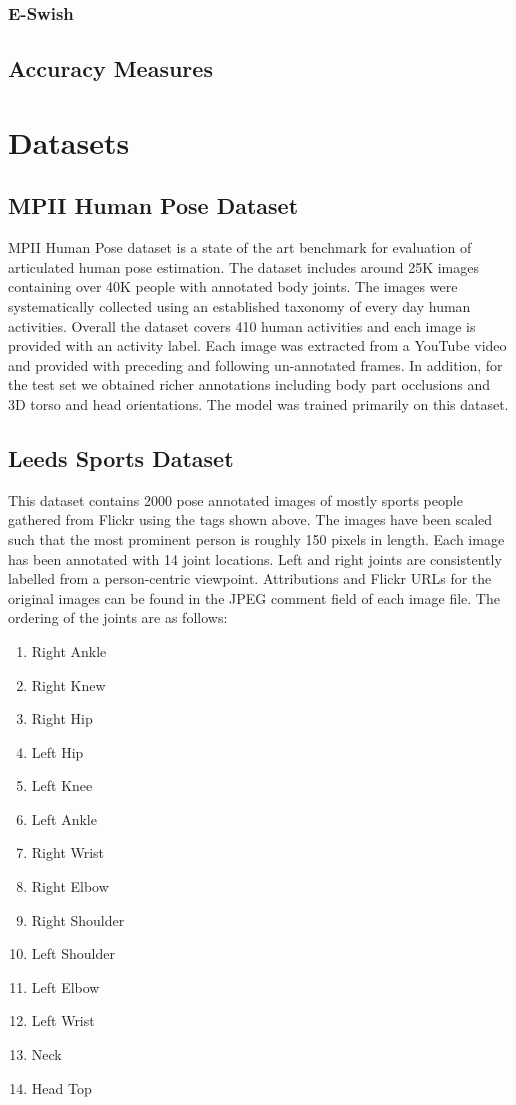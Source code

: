 \documentclass{fisatprojectfinal}
\begin{document}
\subsection{E-Swish}

\section{Accuracy Measures}
\chapter{Datasets}
\section{MPII Human Pose Dataset}
MPII Human Pose dataset is a state of the art benchmark for evaluation of articulated human pose estimation. The dataset includes around 25K images containing over 40K people with annotated body joints. The images were systematically collected using an established taxonomy of every day human activities. Overall the dataset covers 410 human activities and each image is provided with an activity label. Each image was extracted from a YouTube video and provided with preceding and following un-annotated frames. In addition, for the test set we obtained richer annotations including body part occlusions and 3D torso and head orientations.
The model was trained primarily on this dataset.

\section{Leeds Sports Dataset}
This dataset contains 2000 pose annotated images of mostly sports people gathered from Flickr using the tags shown above. The images have been scaled such that the most prominent person is roughly 150 pixels in length. Each image has been annotated with 14 joint locations. Left and right joints are consistently labelled from a person-centric viewpoint. Attributions and Flickr URLs for the original images can be found in the JPEG comment field of each image file. 
The ordering of the joints are as follows:
\begin{enumerate}
	\item Right Ankle
	\item Right Knew
	\item Right Hip
	\item Left Hip
	\item Left Knee
	\item Left Ankle
	\item Right Wrist
	\item Right Elbow
	\item Right Shoulder
	\item Left Shoulder
	\item Left Elbow
	\item Left Wrist
	\item Neck
	\item Head Top
\end{enumerate}
\end{document}
